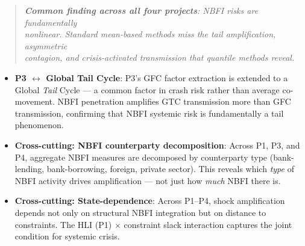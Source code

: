 \documentclass[11pt,a4paper]{article}
\begin{document}
\begin{quote}
\itshape
\textbf{Common finding across all four projects}: NBFI risks are fundamentally \\
nonlinear. Standard mean-based methods miss the tail amplification, asymmetric \\
contagion, and crisis-activated transmission that quantile methods reveal. \\
\end{quote}

\begin{itemize}
\item \textbf{P3 $\leftrightarrow$ Global Tail Cycle}: P3's GFC factor extraction is extended to a
Global \textit{Tail} Cycle --- a common factor in crash risk rather than average
co-movement. NBFI penetration amplifies GTC transmission more than GFC
transmission, confirming that NBFI systemic risk is fundamentally a tail
phenomenon.

\item \textbf{Cross-cutting: NBFI counterparty decomposition}: Across P1, P3, and P4,
aggregate NBFI measures are decomposed by counterparty type (bank-lending,
bank-borrowing, foreign, private sector). This reveals which \textit{type} of NBFI
activity drives amplification --- not just how \textit{much} NBFI there is.

\item \textbf{Cross-cutting: State-dependence}: Across P1--P4, shock amplification
depends not only on structural NBFI integration but on distance to
constraints. The HLI (P1) $\times$ constraint slack interaction captures
the joint condition for systemic crisis.
\end{itemize}
\end{document}
